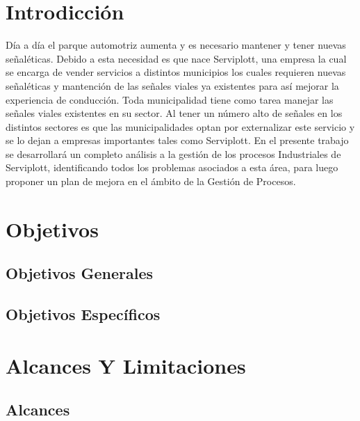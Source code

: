 %
%

\section{Introdicción}
Día a día el parque automotriz aumenta y es necesario mantener y tener nuevas señaléticas. Debido a esta necesidad es que nace Serviplott, una empresa la cual se encarga de vender servicios a distintos municipios los cuales requieren nuevas señaléticas y mantención de las señales viales ya existentes para así mejorar la experiencia de conducción.
\vspace{5mm}
Toda municipalidad tiene como tarea manejar las señales viales existentes en su sector. Al tener un número alto de señales en los distintos sectores es que las municipalidades optan por externalizar este servicio y se lo dejan a empresas importantes tales como Serviplott.
\vspace{5mm}
En el presente trabajo se desarrollará un completo análisis a la gestión de los procesos Industriales de Serviplott, identificando todos los problemas asociados a esta área, para luego proponer un plan de mejora en el ámbito de la Gestión de Procesos.
\vspace{5mm}
\newpage
\section{Objetivos}
	\subsection{Objetivos Generales}
	\subsection{Objetivos Específicos}
\section{Alcances Y Limitaciones}
	\subsection{Alcances}
